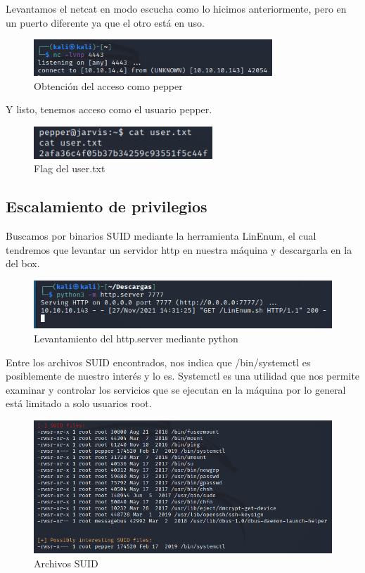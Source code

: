 \documentclass{article}
\begin{document}
Levantamos el netcat en modo escucha como lo hicimos anteriormente, pero en un puerto diferente ya que el otro está en uso.
\begin{figure}[H]
	\center
	\includegraphics[width=0.8\textwidth]{images/jarvis/16.png}
	\caption{Obtención del acceso como pepper}
\end{figure}

Y listo, tenemos acceso como el usuario pepper.
\begin{figure}[H]
	\center
	\includegraphics[width=0.6\textwidth]{images/jarvis/17.png}
	\caption{Flag del user.txt}
\end{figure}

\subsection{Escalamiento de privilegios}
Buscamos por binarios SUID mediante la herramienta LinEnum, el cual tendremos que levantar un servidor http en nuestra máquina y descargarla en la del box.
\begin{figure}[H]
	\center
	\includegraphics[width=\textwidth]{images/jarvis/18.png}
	\caption{Levantamiento del http.server mediante python}
\end{figure}

Entre los archivos SUID encontrados, nos indica que /bin/systemctl es posiblemente de nuestro interés y lo es. Systemctl es una utilidad que nos permite examinar y controlar los servicios que se ejecutan en la máquina por lo general está limitado a solo usuarios root.
\begin{figure}[H]
	\center
	\includegraphics[width=\textwidth]{images/jarvis/19.png}
	\caption{Archivos SUID}
\end{figure}
\end{document}
